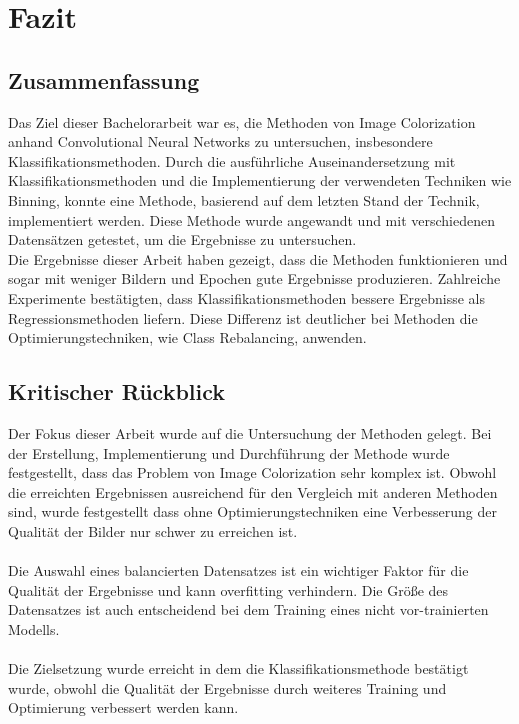 \chapter{Fazit} 

\section{Zusammenfassung}
Das Ziel dieser Bachelorarbeit war es, die Methoden von Image Colorization anhand Convolutional Neural Networks zu untersuchen, insbesondere
Klassifikationsmethoden. Durch die ausführliche Auseinandersetzung mit Klassifikationsmethoden und die Implementierung der verwendeten Techniken
wie Binning, konnte eine Methode, basierend auf dem letzten Stand der Technik, implementiert werden. Diese Methode wurde angewandt und mit verschiedenen
Datensätzen getestet, um die Ergebnisse zu untersuchen.
\\
Die Ergebnisse dieser Arbeit haben gezeigt, dass die Methoden funktionieren und sogar mit weniger Bildern und Epochen gute Ergebnisse produzieren.
Zahlreiche Experimente bestätigten, dass Klassifikationsmethoden bessere Ergebnisse als Regressionsmethoden liefern. Diese Differenz ist deutlicher
bei Methoden die Optimierungstechniken, wie Class Rebalancing, anwenden.


\section{Kritischer Rückblick}
Der Fokus dieser Arbeit wurde auf die Untersuchung der Methoden gelegt. Bei der Erstellung, Implementierung und Durchführung der Methode wurde
festgestellt, dass das Problem von Image Colorization sehr komplex ist. Obwohl die erreichten Ergebnissen ausreichend für den Vergleich mit 
anderen Methoden sind, wurde festgestellt dass ohne Optimierungstechniken eine Verbesserung der Qualität der Bilder nur schwer zu erreichen ist.
\\
\\
Die Auswahl eines balancierten Datensatzes ist ein wichtiger Faktor für die Qualität der Ergebnisse und kann \gls{overfitting} verhindern. Die Größe 
des Datensatzes ist auch entscheidend bei dem Training eines nicht vor-trainierten Modells.
\\
\\
Die Zielsetzung wurde erreicht in dem die Klassifikationsmethode bestätigt wurde, obwohl die Qualität der Ergebnisse durch weiteres Training
und Optimierung verbessert werden kann.

